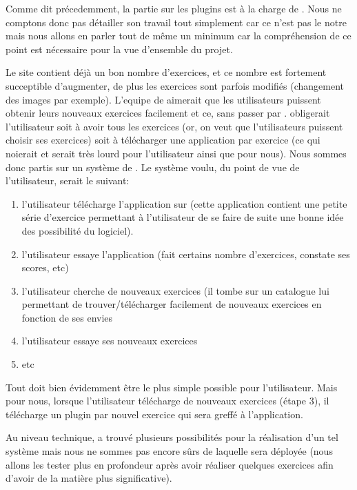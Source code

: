 Comme dit précedemment, la partie sur les plugins est à la charge de \etudiantSL{}. Nous ne comptons donc pas détailler son travail tout simplement car ce n'est pas le notre mais nous allons en parler tout de même un minimum car la compréhension de ce point est nécessaire pour la vue d'ensemble du projet.

Le site \pepit{} contient déjà un bon nombre d'exercices, et ce nombre est fortement succeptible d'augmenter, de plus les exercices sont parfois modifiés (changement des images par exemple). L'equipe de \pepit{} aimerait que les utilisateurs puissent obtenir leurs nouveaux exercices facilement et ce, sans passer par \market{}. \market{} obligerait l'utilisateur soit à avoir tous les exercices (or, on veut que l'utilisateurs puissent choisir ses exercices) soit à télécharger une application par exercice (ce qui noierait \market{} et serait très lourd pour l'utilisateur ainsi que pour nous).
\newline
Nous sommes donc partis sur un système de \plugins{}. Le système voulu, du point de vue de l'utilisateur, serait le suivant:
\begin{enumerate}
	\item l'utilisateur télécharge l'application sur \market{} (cette application contient une petite série d'exercice permettant à l'utilisateur de se faire de suite une bonne idée des possibilité du logiciel).
	\item l'utilisateur essaye l'application (fait certains nombre d'exercices, constate ses scores, etc)
	\item l'utilisateur cherche de nouveaux exercices (il tombe sur un catalogue lui permettant de trouver/télécharger facilement de nouveaux exercices en fonction de ses envies
	\item l'utilisateur essaye ses nouveaux exercices
	\item etc
\end{enumerate}
Tout doit bien évidemment être le plus simple possible pour l'utilisateur. Mais pour nous, lorsque l'utilisateur télécharge de nouveaux exercices (étape 3), il télécharge un plugin par nouvel exercice qui sera greffé à l'application. 

Au niveau technique, \etudiantSL{} a trouvé plusieurs possibilités pour la réalisation d'un tel système mais nous ne sommes pas encore sûrs de laquelle sera déployée (nous allons les tester plus en profondeur après avoir réaliser quelques exercices afin d'avoir de la matière plus significative).
